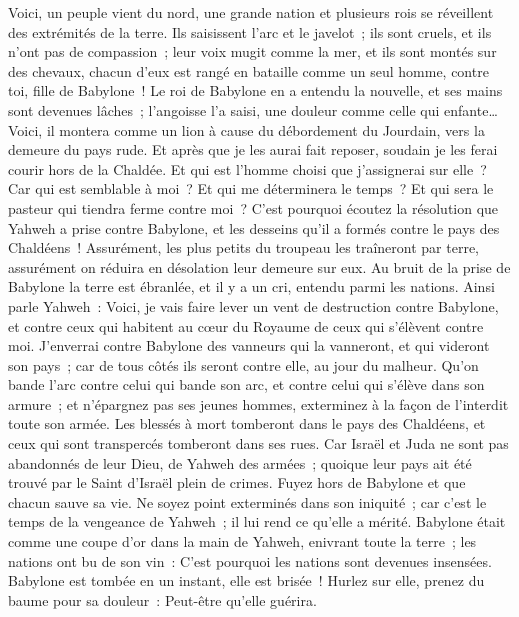 \begin{multicols}{2}
Voici, un peuple vient du nord, une grande nation et plusieurs rois se réveillent des extrémités de la terre.
Ils saisissent l'arc et le javelot~; ils sont cruels, et ils n'ont pas de compassion~; leur voix mugit comme la mer, et ils sont montés sur des chevaux, chacun d'eux est rangé en bataille comme un seul homme, contre toi, fille de Babylone~!
Le roi de Babylone en a entendu la nouvelle, et ses mains sont devenues lâches~; l'angoisse l'a saisi, une douleur comme celle qui enfante…
Voici, il montera comme un lion à cause du débordement du Jourdain, vers la demeure du pays rude. Et après que je les aurai fait reposer, soudain je les ferai courir hors de la Chaldée. Et qui est l'homme choisi que j'assignerai sur elle~? Car qui est semblable à moi~? Et qui me déterminera le temps~? Et qui sera le pasteur qui tiendra ferme contre moi~?
C'est pourquoi écoutez la résolution que Yahweh a prise contre Babylone, et les desseins qu'il a formés contre le pays des Chaldéens~! Assurément, les plus petits du troupeau les traîneront par terre, assurément on réduira en désolation leur demeure sur eux.
Au bruit de la prise de Babylone la terre est ébranlée, et il y a un cri, entendu parmi les nations.
\VerseOne{}Ainsi parle Yahweh~: Voici, je vais faire lever un vent de destruction contre Babylone, et contre ceux qui habitent au cœur du Royaume de ceux qui s'élèvent contre moi.
J'enverrai contre Babylone des vanneurs qui la vanneront, et qui videront son pays~; car de tous côtés ils seront contre elle, au jour du malheur.
Qu'on bande l'arc contre celui qui bande son arc, et contre celui qui s'élève dans son armure~; et n'épargnez pas ses jeunes hommes, exterminez à la façon de l'interdit toute son armée.
Les blessés à mort tomberont dans le pays des Chaldéens, et ceux qui sont transpercés tomberont dans ses rues.
Car Israël et Juda ne sont pas abandonnés de leur Dieu, de Yahweh des armées~; quoique leur pays ait été trouvé par le Saint d'Israël plein de crimes.
Fuyez hors de Babylone et que chacun sauve sa vie. Ne soyez point exterminés dans son iniquité~; car c'est le temps de la vengeance de Yahweh~; il lui rend ce qu'elle a mérité.
Babylone était comme une coupe d'or dans la main de Yahweh, enivrant toute la terre~; les nations ont bu de son vin~: C'est pourquoi les nations sont devenues insensées.
Babylone est tombée en un instant, elle est brisée~! Hurlez sur elle, prenez du baume pour sa douleur~: Peut-être qu'elle guérira.

\end{multicols}
